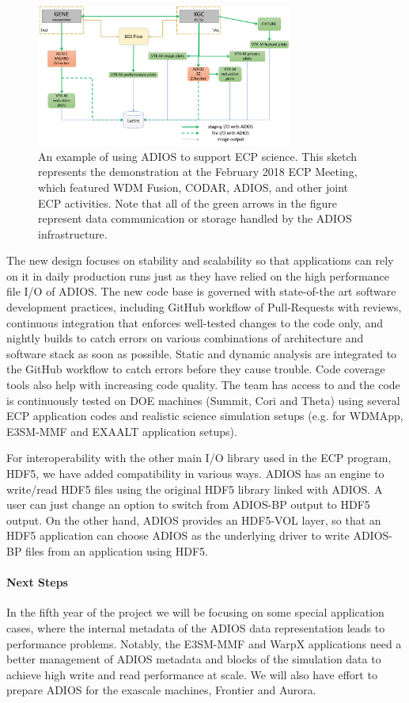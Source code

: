 \begin{figure}[!th]
	\begin{center}
		\includegraphics[width=0.75\textwidth]{projects/2.3.4-DataViz/2.3.4.09-ADIOS/ADIOS_in_ECP.png}
		\caption{An example of using ADIOS to support ECP science.  This sketch represents the demonstration at the February 2018 ECP Meeting, which featured WDM Fusion, CODAR, ADIOS, and other joint ECP activities.  Note that all of the green arrows in the figure represent data communication or storage handled by the ADIOS infrastructure.}
		\label{fig:adios-example}
	\end{center}
\end{figure}

The new design focuses on stability and scalability so that applications can rely on it in daily production runs just as they have relied on the high performance file I/O of ADIOS. The new code base is governed with state-of-the art software development practices, including GitHub workflow of Pull-Requests with reviews, continuous integration that enforces well-tested changes to the code only, and nightly builds to catch errors on various combinations of architecture and software stack as soon as possible. Static and dynamic analysis are integrated to the GitHub workflow to catch errors before they cause trouble. Code coverage tools also help with increasing code quality. The team has access to and the code is continuously tested on DOE machines (Summit, Cori and Theta) using several ECP application codes and realistic science simulation setups (e.g. for WDMApp, E3SM-MMF and EXAALT application setups). 

For interoperability with the other main I/O library used in the ECP program, HDF5, we have added compatibility in various ways.
ADIOS has an engine to write/read HDF5 files using the original HDF5 library linked with ADIOS. A user can just change an option to switch from ADIOS-BP output to HDF5 output. On the other hand, ADIOS provides an HDF5-VOL layer, so that an HDF5 application can choose ADIOS as the underlying driver to write ADIOS-BP files from an application using HDF5. 


\paragraph{Next Steps}
In the fifth year of the project we will be focusing on some special application cases, where the internal metadata of the ADIOS data representation leads to performance problems. Notably, the E3SM-MMF and WarpX applications need a better management of ADIOS metadata and blocks of the simulation data to achieve high write and read performance at scale. We will also have effort to prepare ADIOS for the exascale machines, Frontier and Aurora. 
